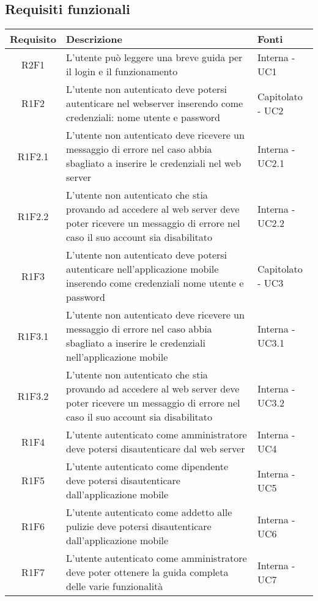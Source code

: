 \subsection{Requisiti funzionali}
\begin{center}
	\begin{longtable}{|c|p{10cm}|p{4cm}|}
		\hline
		\rowcolor{lighter-grayer}
		\textbf{Requisito} & \textbf{Descrizione} & \textbf{Fonti}  \\
		\hline
		\endhead
		
		 R2F1 & L'utente può leggere una breve guida per il login e il funzionamento & Interna - UC1 \\
		\hline
		R1F2	&	L'utente non autenticato deve potersi autenticare nel webserver inserendo come credenziali: nome utente e password & Capitolato - UC2	\\
		\hline
		R1F2.1	&	L'utente non autenticato deve ricevere un messaggio di errore nel caso abbia sbagliato a inserire le credenziali nel web server& Interna - UC2.1	\\
		\hline
		R1F2.2	&	L'utente non autenticato che stia provando ad accedere al web server deve poter ricevere un messaggio di errore nel caso il suo account sia disabilitato& Interna - UC2.2	\\
		\hline
		R1F3	&	L'utente non autenticato deve potersi autenticare nell'applicazione mobile inserendo come credenziali nome utente e password & Capitolato - UC3	\\
		\hline
		R1F3.1	&	L'utente non autenticato deve ricevere un messaggio di errore nel caso abbia sbagliato a inserire le credenziali nell'applicazione mobile& Interna - UC3.1	\\
		\hline
		R1F3.2	&	L'utente non autenticato che stia provando ad accedere al web server deve poter ricevere un messaggio di errore nel caso il suo account sia disabilitato& Interna - UC3.2	\\
		\hline
		R1F4	&	L'utente autenticato come amministratore deve potersi disautenticare dal web server& Interna - UC4	\\
		\hline
		R1F5	&	L'utente autenticato come dipendente deve potersi disautenticare dall'applicazione mobile& Interna - UC5	\\
		\hline
		R1F6	&	L'utente autenticato come addetto alle pulizie deve potersi disautenticare dall'applicazione mobile& Interna - UC6	\\
		\hline
		R1F7	&	L'utente autenticato come amministratore deve poter ottenere la guida completa delle varie funzionalità& Interna - UC7	\\

\end{longtable}
\end{center}
